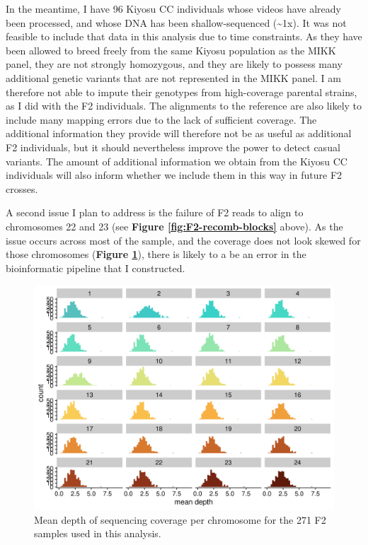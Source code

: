 \documentclass[
]{book}
\begin{document}
In the meantime, I have 96 Kiyosu CC individuals whose videos have already been processed, and whose DNA has been shallow-sequenced (\textasciitilde1x). It was not feasible to include that data in this analysis due to time constraints. As they have been allowed to breed freely from the same Kiyosu population as the MIKK panel, they are not strongly homozygous, and they are likely to possess many additional genetic variants that are not represented in the MIKK panel. I am therefore not able to impute their genotypes from high-coverage parental strains, as I did with the F2 individuals. The alignments to the reference are also likely to include many mapping errors due to the lack of sufficient coverage. The additional information they provide will therefore not be as useful as additional F2 individuals, but it should nevertheless improve the power to detect casual variants. The amount of additional information we obtain from the Kiyosu CC individuals will also inform whether we include them in this way in future F2 crosses.

A second issue I plan to address is the failure of F2 reads to align to chromosomes 22 and 23 (see \textbf{Figure \ref{fig:F2-recomb-blocks}} above). As the issue occurs across most of the sample, and the coverage does not look skewed for those chromosomes (\textbf{Figure \ref{fig:F2-coverage}}), there is likely to a be an error in the bioinformatic pipeline that I constructed.



\begin{figure}
\includegraphics[width=1\linewidth]{figs/mikk_behaviour/coverage_F2} \caption{Mean depth of sequencing coverage per chromosome for the 271 F2 samples used in this analysis.}\label{fig:F2-coverage}
\end{figure}
\end{document}

